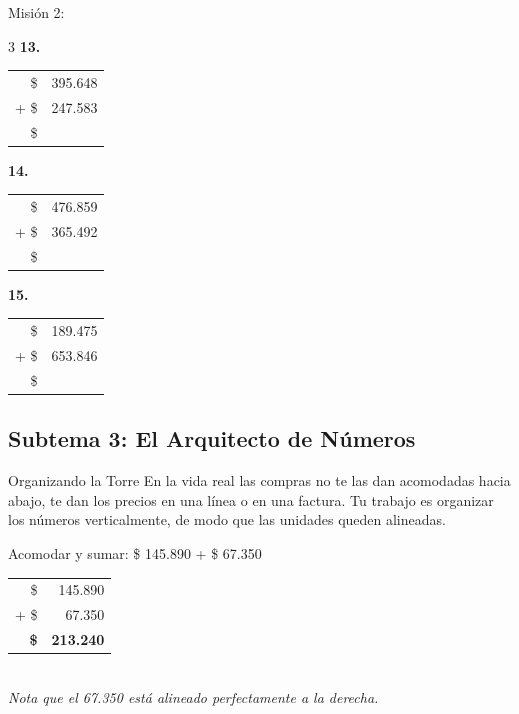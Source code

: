 \documentclass[12pt, letterpaper]{article}
\newcommand{\boxfill}[1][1.2cm]{\tcbox[on line, size=minimal, colframe=valdark!80, colback=white, boxrule=0.5pt, arc=1mm, boxsep=2pt, left=2pt, right=2pt, top=2pt, bottom=2pt]{\makebox[#1]{\vphantom{M}}}}
\begin{document}
\begin{practica}{Misión 2: }
\vspace{0.6cm}
\begin{multicols}{3}
    \textbf{13.}\\
    \begin{tabular}{rr}
      \$ & 395.648 \\
    + \$ & 247.583 \\
    \hline
      \$ & \boxfill[2cm]
    \end{tabular}

    \textbf{14.}\\
    \begin{tabular}{rr}
      \$ & 476.859 \\
    + \$ & 365.492 \\
    \hline
      \$ & \boxfill[2cm]
    \end{tabular}

    \textbf{15.}\\
    \begin{tabular}{rr}
      \$ & 189.475 \\
    + \$ & 653.846 \\
    \hline
      \$ & \boxfill[2cm]
    \end{tabular}
\end{multicols}
\end{practica}


\vspace{0.5cm}
\noindent\begin{minipage}{\textwidth}
\subsection*{Subtema 3: El Arquitecto de Números}

\begin{concepto}{Organizando la Torre}
En la vida real las compras no te las dan acomodadas hacia abajo, te dan los precios en una línea o en una factura. Tu trabajo es organizar los números verticalmente, de modo que las unidades queden alineadas.
\end{concepto}

\begin{ejemplo}
Acomodar y sumar: \$ 145.890 + \$ 67.350 \\[0.2cm]
\begin{tabular}{rr}
  \$ & 145.890 \\
+ \$ & 67.350 \\
\hline
  \textbf{\$} & \textbf{213.240}
\end{tabular}
\\[0.2cm]
\small \textit{Nota que el 67.350 está alineado perfectamente a la derecha.}
\end{ejemplo}
\end{minipage}
\end{document}

